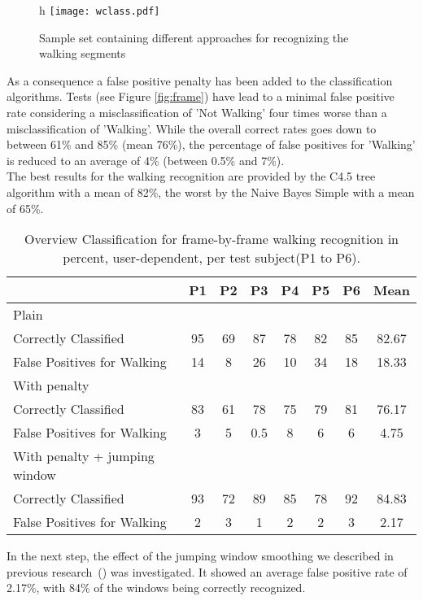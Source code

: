 \begin{figure}{h}
\centering   
\texttt{[image: wclass.pdf]}
\caption[Sample for recognizing walking]{Sample set containing different approaches for recognizing the walking segments}
\label{fig:walk}
\end{figure}

As a consequence a false positive penalty has been added to the
classification algorithms. Tests (see Figure \ref{fig:frame}) have lead to
a minimal false positive 
rate considering a misclassification of 'Not Walking'  four times 
worse than a misclassification of 'Walking'. 
While 
the overall correct rates goes down to  between 61\% 
and 85\% (mean 76\%), the percentage of false positives for 'Walking'
is reduced to an average of 4\% (between 0.5\% and 7\%).\\
The best results for the walking recognition are provided by the C4.5 tree algorithm with a mean
of 82\%, the worst by the Naive Bayes Simple with 
a mean of 65\%.

\begin{table}[ht]
\caption[Frame by frame Overview]{Overview Classification for frame-by-frame walking recognition in percent,
user-dependent, per test subject(P1 to P6).}
\begin{tabularx}{\textwidth}{ l c c c c c c c}
\toprule                               
  & P1   & P2   &P3   & P4 & P5 & P6 & Mean\\ \hline
Plain  & & & & & & &\\
Correctly Classified &95 &69 &87 &78 &82 &85 &82.67\\
False Positives for Walking  &14 &8 &26 &10 &34 &18 &18.33\\\hline
With penalty  & & & & & & &\\
Correctly Classified            &83     &61     &78     &75     &79     &81     &76.17\\        
False Positives for Walking             &3      &5      &0.5    &8      &6      &6      &4.75\\\midrule
With penalty + jumping window  & & & & & & &\\
Correctly Classified             &93    &72     &89     &85     &78     &92     &84.83\\        
False Positives for Walking             &2      &3      &1      &2      &2      &3      &2.17\\ \bottomrule
\end{tabularx}
\label{table:walk}
\end{table}
In the next step, the effect of the jumping window smoothing we
described in previous research~(\cite{Kunze:2007p86}) was investigated. It showed an average
false positive rate of 2.17\%, with 84\% of the windows being correctly
recognized.


